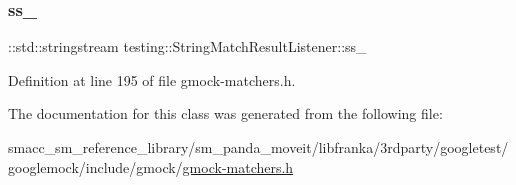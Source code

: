 \subsubsection{\texorpdfstring{ss\+\_\+}{ss\_}}
{\footnotesize\ttfamily \+::std\+::stringstream testing\+::\+String\+Match\+Result\+Listener\+::ss\+\_\+\hspace{0.3cm}{\ttfamily [private]}}



Definition at line 195 of file gmock-\/matchers.\+h.



The documentation for this class was generated from the following file\+:\begin{DoxyCompactItemize}
\item 
smacc\+\_\+sm\+\_\+reference\+\_\+library/sm\+\_\+panda\+\_\+moveit/libfranka/3rdparty/googletest/googlemock/include/gmock/\hyperlink{gmock-matchers_8h}{gmock-\/matchers.\+h}\end{DoxyCompactItemize}
